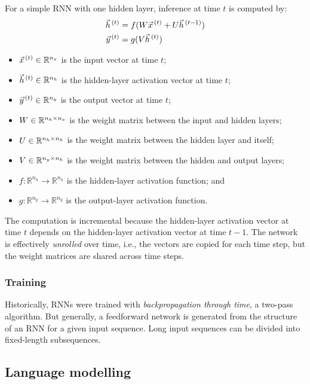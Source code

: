 For a simple RNN with one hidden layer, inference at time $t$ is computed by:
\begin{align}
  \vec{h}^{\,(t)} & = f(W \vec{x}^{\,(t)} + U \vec{h}^{\,(t - 1)}) \\
  \vec{y}^{\,(t)} & = g(V \vec{h}^{\,(t)})
\end{align}
\begin{itemize}
  \item $\vec{x}^{\,(t)} \in \mathbb{R}^{n_x}$ is the input vector at time $t$;
  \item $\vec{h}^{\,(t)} \in \mathbb{R}^{n_h}$ is the hidden-layer activation vector at time $t$;
  \item $\vec{y}^{\,(t)} \in \mathbb{R}^{n_y}$ is the output vector at time $t$;
  \item $W \in \mathbb{R}^{n_h \times n_x}$ is the weight matrix between the input and hidden layers;
  \item $U \in \mathbb{R}^{n_h \times n_h}$ is the weight matrix between the hidden layer and itself;
  \item $V \in \mathbb{R}^{n_y \times n_h}$ is the weight matrix between the hidden and output layers;
  \item $f : \mathbb{R}^{n_h} \to \mathbb{R}^{n_h}$ is the hidden-layer activation function; and
  \item $g : \mathbb{R}^{n_y} \to \mathbb{R}^{n_y}$ is the output-layer activation function.
\end{itemize}
The computation is incremental because the hidden-layer activation vector at
time $t$ depends on the hidden-layer activation vector at time $t - 1$.
The network is effectively \textit{unrolled} over time, i.e., the vectors are
copied for each time step, but the weight matrices are shared across time steps.

\subsubsection{Training}

Historically, RNNs were trained with \textit{backpropagation through time}, a
two-pass algorithm.
But generally, a feedforward network is generated from the structure of an RNN
for a given input sequence.
Long input sequences can be divided into fixed-length subsequences.

\subsection{Language modelling}
\label{sec:9:rnn-lm}


